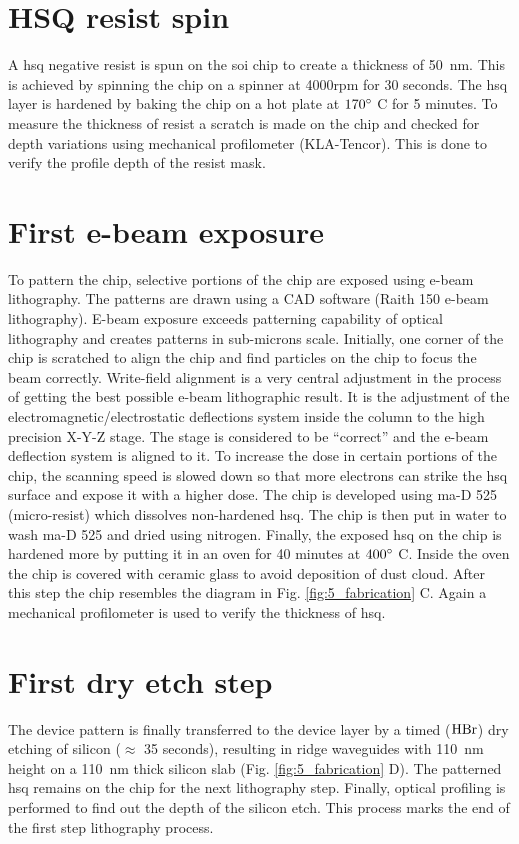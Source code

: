 \documentclass[../report.tex]{subfiles}
\begin{document}
\section{HSQ resist spin}
A \gls{hsq} negative resist is spun on the \gls{soi} chip to create a thickness of \SI{50}{\nano \meter}. This is achieved by spinning the chip on a spinner at 4000rpm for 30 seconds. The \gls{hsq} layer is hardened by baking the chip on a hot plate at $\mathrm{170^{\circ}}$ C for 5 minutes. To measure the thickness of resist a scratch is made on the chip and checked for depth variations using mechanical profilometer (KLA-Tencor). This is done to verify the profile depth of the resist mask.

\section{First e-beam exposure}
To pattern the chip, selective portions of the chip are exposed using e-beam lithography. The patterns are drawn using a CAD software (Raith 150 e-beam lithography). E-beam exposure exceeds patterning capability of optical lithography and creates patterns in sub-microns scale. Initially, one corner of the chip is scratched to align the chip and find particles on the chip to focus the beam correctly. Write-field alignment is a very central adjustment in the process of getting the best possible e-beam lithographic result. It is the adjustment of the electromagnetic/electrostatic deflections system inside the column to the high precision X-Y-Z stage. The stage is considered to be ``correct'' and the e-beam deflection system is aligned to it. To increase the dose in certain portions of the chip, the scanning speed is slowed down so that more electrons can strike the \gls{hsq} surface and expose it with a higher dose. The chip is developed using ma-D 525 (micro-resist) which dissolves non-hardened \gls{hsq}. The chip is then put in water to wash ma-D 525 and dried using nitrogen. Finally, the exposed \gls{hsq} on the chip is hardened more by putting it in an oven for 40 minutes at $\mathrm{400^{\circ}}$ C. Inside the oven the chip is covered with ceramic glass to avoid deposition of dust cloud. After this step the chip resembles the diagram in Fig. \ref{fig:5_fabrication} C. Again a mechanical profilometer is used to verify the thickness of \gls{hsq}.    

\section{First dry etch step}
The device pattern is finally transferred to the device layer by a timed ($\mathrm{HBr}$) dry etching of silicon ($\approx$ 35 seconds), resulting in ridge waveguides with \SI{110}{\nano \meter} height on a \SI{110}{\nano \meter} thick silicon slab (Fig. \ref{fig:5_fabrication} D). The patterned \gls{hsq} remains on the chip for the next lithography step. Finally, optical profiling is performed to find out the depth of the silicon etch. This process marks the end of the first step lithography process.
\end{document}
